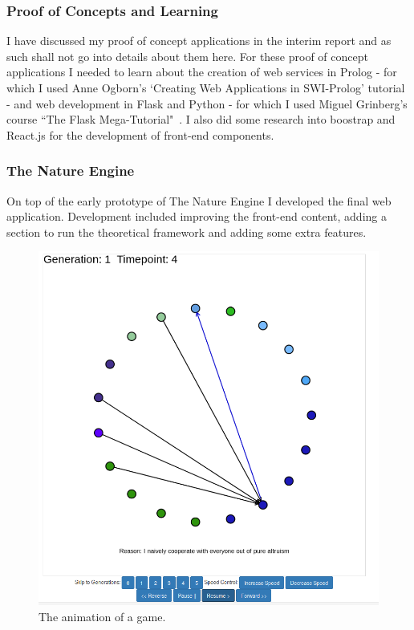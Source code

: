 \documentclass[]{final_report}
\begin{document}
\subsubsection{Proof of Concepts and Learning}
I have discussed my proof of concept applications in the interim report and as such shall not go into details about them here. For these proof of concept applications I needed to learn about the creation of web services in Prolog - for which I used Anne Ogborn's `Creating Web Applications in SWI-Prolog' tutorial~\cite{swi_web_tut} - and web development in Flask and Python - for which I used Miguel Grinberg's course ``The Flask Mega-Tutorial"~\cite{flask_tut}. I also did some research into boostrap and React.js for the development of front-end components.

\subsubsection{The Nature Engine}
On top of the early prototype of The Nature Engine I developed the final web application. Development included improving the front-end content, adding a section to run the theoretical framework and adding some extra features.\par 
\begin{figure}
\vspace{-20pt}
\begin{framed}
	\begin{center}
	\includegraphics[width=\textwidth]{Animation.png}
	\caption{The animation of a game.}
	\label{fig:animation}
	\end{center}
\end{framed}
\vspace{-20pt}
\end{figure}
\end{document}
